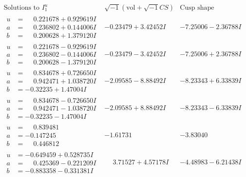 \documentclass[1p]{elsarticle_modified}
\theoremstyle{definition}
\newcommand{\I}{\sqrt{-1}}
\begin{document}
$$\begin{array}{c|c|c}  
\text{Solutions to }I^u_{1}& \I (\text{vol} + \sqrt{-1}CS) & \text{Cusp shape}\\
 \hline 
\begin{aligned}
u &= \phantom{-}0.221678 + 0.929619 I \\
a &= \phantom{-}0.236802 + 0.144006 I \\
b &= \phantom{-}0.200628 + 1.379120 I\end{aligned}
 & -0.23479 + 3.42452 I & -7.25006 - 2.36788 I \\ \hline\begin{aligned}
u &= \phantom{-}0.221678 - 0.929619 I \\
a &= \phantom{-}0.236802 - 0.144006 I \\
b &= \phantom{-}0.200628 - 1.379120 I\end{aligned}
 & -0.23479 - 3.42452 I & -7.25006 + 2.36788 I \\ \hline\begin{aligned}
u &= \phantom{-}0.834678 + 0.726650 I \\
a &= \phantom{-}0.942471 + 1.038720 I \\
b &= -0.32235 + 1.47004 I\end{aligned}
 & -2.09585 - 8.88492 I & -8.23343 + 6.33839 I \\ \hline\begin{aligned}
u &= \phantom{-}0.834678 - 0.726650 I \\
a &= \phantom{-}0.942471 - 1.038720 I \\
b &= -0.32235 - 1.47004 I\end{aligned}
 & -2.09585 + 8.88492 I & -8.23343 - 6.33839 I \\ \hline\begin{aligned}
u &= \phantom{-}0.839481\phantom{ +0.000000I} \\
a &= -0.147245\phantom{ +0.000000I} \\
b &= \phantom{-}0.446812\phantom{ +0.000000I}\end{aligned}
 & -1.61731\phantom{ +0.000000I} & -3.83040\phantom{ +0.000000I} \\ \hline\begin{aligned}
u &= -0.649459 + 0.528735 I \\
a &= \phantom{-}0.425369 - 0.221209 I \\
b &= -0.883358 - 0.331381 I\end{aligned}
 & \phantom{-}3.71527 + 4.57178 I & -4.48983 - 6.21438 I \\ \hline\begin{aligned}

\end{aligned}
\end{array}$$
\end{document}
